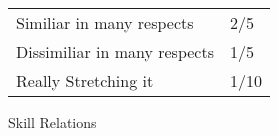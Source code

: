 \begin{SHTable}[h]
	\begin{tabular}{l|l}
	Similiar in many respects     &       2/5 \\
	Dissimiliar in many respects  &       1/5 \\
	Really Stretching it		  &       1/10 \\ 
    \end{tabular}
    \caption{Skill Relations}
\end{SHTable}
